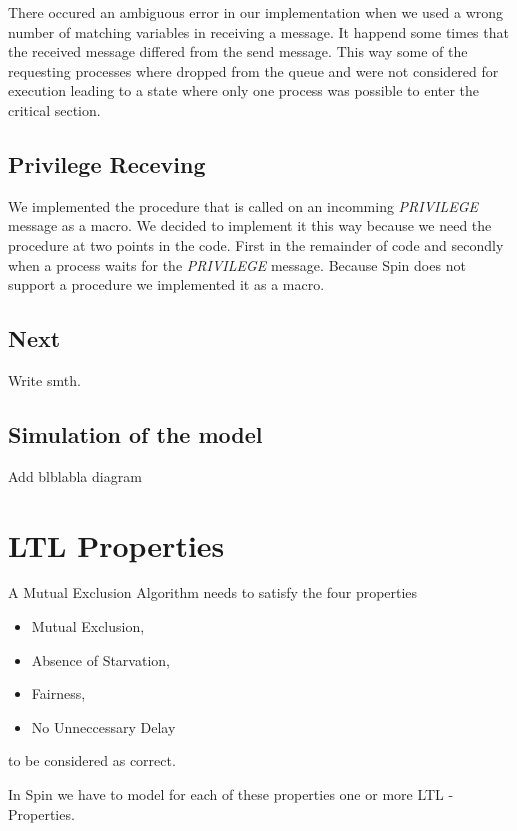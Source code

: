 \documentclass{llncs}
\begin{document}
There occured an ambiguous error in our implementation when we used a wrong number of matching
variables in receiving a message. It happend some times that the received message differed from the
send message. This way some of the requesting processes where dropped from the queue and were not considered
for execution leading to a state where only one process was possible to enter the critical section.

\subsection{Privilege Receving}

We implemented the procedure that is called on an incomming \emph{PRIVILEGE} message as a macro.
We decided to implement it this way because we need the procedure at two points in the code.
First in the remainder of code and secondly when a process waits for the \emph{PRIVILEGE} message.
Because Spin does not support a procedure we implemented it as a macro.

\subsection{Next}

Write smth.

\subsection{Simulation of the model\label{ssec:run}}

Add blblabla diagram

\section{LTL Properties}

A Mutual Exclusion Algorithm needs to satisfy the four properties
\begin{itemize}
    \item Mutual Exclusion,
    \item Absence of Starvation,
    \item Fairness,
    \item No Unneccessary Delay
\end{itemize}
to be considered as correct.

In Spin we have to model for each of these properties one or more
LTL - Properties.
\end{document}
